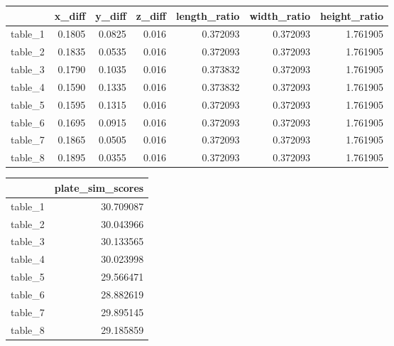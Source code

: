 \documentclass[12pt]{article}
\begin{document}
\begin{tabular}{lrrrrrr}
\toprule
{} &  x\_diff &  y\_diff &  z\_diff &  length\_ratio &  width\_ratio &  height\_ratio \\
\midrule
table\_1 &                     0.1805 &                     0.0825 &                      0.016 &                0.372093 &               0.372093 &                1.761905 \\
table\_2 &                     0.1835 &                     0.0535 &                      0.016 &                0.372093 &               0.372093 &                1.761905 \\
table\_3 &                     0.1790 &                     0.1035 &                      0.016 &                0.373832 &               0.372093 &                1.761905 \\
table\_4 &                     0.1590 &                     0.1335 &                      0.016 &                0.373832 &               0.372093 &                1.761905 \\
table\_5 &                     0.1595 &                     0.1315 &                      0.016 &                0.372093 &               0.372093 &                1.761905 \\
table\_6 &                     0.1695 &                     0.0915 &                      0.016 &                0.372093 &               0.372093 &                1.761905 \\

table\_7 &                     0.1865 &                     0.0505 &                      0.016 &                0.372093 &               0.372093 &                1.761905 \\
table\_8 &                     0.1895 &                     0.0355 &                      0.016 &                0.372093 &               0.372093 &                1.761905 \\
\bottomrule
\end{tabular}

\begin{tabular}{lr}
\toprule
{} &  plate\_sim\_scores \\
\midrule
table\_1 &         30.709087 \\
table\_2 &         30.043966 \\
table\_3 &         30.133565 \\
table\_4 &         30.023998 \\
table\_5 &         29.566471 \\
table\_6 &         28.882619 \\

table\_7 &         29.895145 \\
table\_8 &         29.185859 \\
\bottomrule
\end{tabular}
\end{document}
